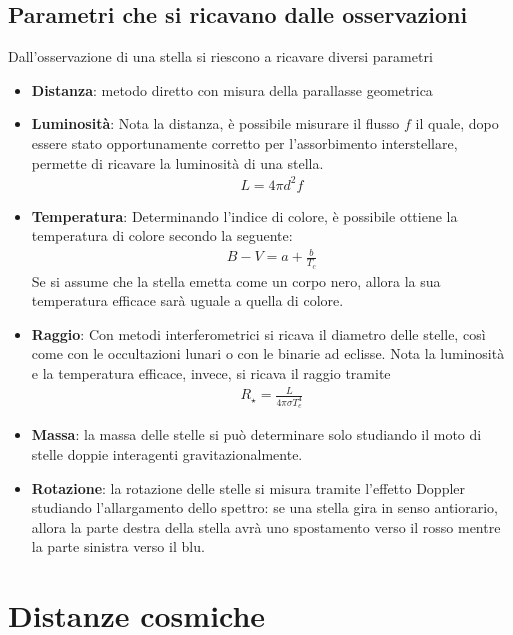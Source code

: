 \documentclass[a4paper, oneside]{book}
\begin{document}
\section{Parametri che si ricavano dalle osservazioni}
Dall'osservazione di una stella si riescono a ricavare diversi parametri 
\begin{itemize}
    \item \textbf{Distanza}: metodo diretto con misura della parallasse geometrica 
    \item \textbf{Luminosità}: Nota la distanza, è possibile misurare il flusso $f$ il quale,
    dopo essere stato opportunamente corretto per l'assorbimento interstellare, permette di ricavare
    la luminosità di una stella.
    \begin{gather*}
        L  = 4\pi d^{2}f
    \end{gather*} 
    \item \textbf{Temperatura}: Determinando l'indice di colore, è possibile ottiene la temperatura
    di colore secondo la seguente:
    \begin{gather*}
        B - V = a + \frac{b}{T_c}
    \end{gather*}
    Se si assume che la stella emetta come un corpo nero, allora la sua temperatura
    efficace sarà uguale a quella di colore. 
    \item \textbf{Raggio}: Con metodi interferometrici si ricava il diametro delle stelle, così 
    come con le occultazioni lunari o con le binarie ad eclisse. Nota la luminosità e la temperatura
    efficace, invece, si ricava il raggio tramite
    \begin{gather*}
        R_\star = \frac{L}{4\pi\sigma T_e^{4}}
    \end{gather*}
    \item \textbf{Massa}: la massa delle stelle si può determinare solo studiando il moto di stelle doppie interagenti
    gravitazionalmente. 
    \item \textbf{Rotazione}: la rotazione delle stelle si misura tramite l'effetto Doppler studiando 
    l'allargamento dello spettro: se una stella gira in senso antiorario, allora la parte
    destra della stella avrà uno spostamento verso il rosso mentre la parte sinistra verso il blu. 
\end{itemize}







\chapter{Distanze cosmiche}
\end{document}
